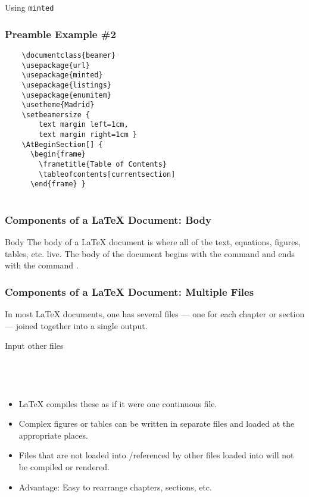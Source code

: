 \begin{frame}[fragile]{Using \texttt{minted}}
\frametitle{Preamble Example \#2}
\begin{verbatim} 
    \documentclass{beamer}
    \usepackage{url}
    \usepackage{minted}
    \usepackage{listings}
    \usepackage{enumitem}
    \usetheme{Madrid}
    \setbeamersize {
        text margin left=1cm,
        text margin right=1cm }
    \AtBeginSection[] {
      \begin{frame}
        \frametitle{Table of Contents}
        \tableofcontents[currentsection]
      \end{frame} }
    
\end{verbatim}
\end{frame}

\begin{frame}[fragile]
\frametitle{Components of a \LaTeX{} Document: Body}
\begin{block}{Body}
    The body of a \LaTeX{} document is where all of the text, equations, figures, tables, etc. live.  The body of the document begins with the command \verb|| and ends with the command \verb||.  
\end{block}
\end{frame}



\begin{frame}[fragile]
\frametitle{Components of a \LaTeX{} Document: Multiple Files}
In most \LaTeX{} documents, one has several  files --- one for each chapter or section --- joined together into a single output. \pause
\begin{block}{Input other files}
\small
\begin{verbatim}




\end{verbatim}
\end{block} \pause
\begin{itemize}[$\bullet$]
    \item \LaTeX{} compiles these as if it were one continuous file. \pause
    \item Complex  figures or tables can be written in separate  files and loaded at the appropriate places. \pause
    \item Files that are not loaded into /referenced by other files loaded into  will not be compiled or rendered. \pause
    \item Advantage: Easy to rearrange chapters, sections, etc.
\end{itemize}
\end{frame}

